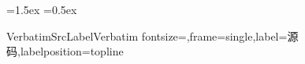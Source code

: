 \usepackage{fancyvrb}

\newlength{\VerbatimHalfWidthLength}
\textwidth
\newlength{\VerbatimSkipTop}
\newlength{\VerbatimSkipBottom}
\VerbatimSkipTop=1.5ex
\VerbatimSkipBottom=0.5ex

\DefineVerbatimEnvironment
{VerbatimSrcLabel}{Verbatim}
{fontsize=\footnotesize,frame=single,label=源码,labelposition=topline}
